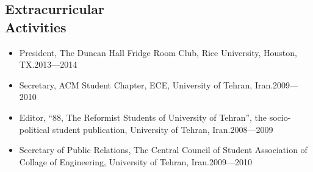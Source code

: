 \documentclass[overlapped]{res}
\begin{document}
\begin{resume}
\section{Extracurricular\\ Activities}
\begin{itemize}
\item President, The Duncan Hall Fridge Room Club, Rice University, Houston, TX.\hfill 2013---2014
\item Secretary, ACM Student Chapter, ECE, University of Tehran, Iran.\hfill 2009---2010
\item Editor, ``88, The Reformist Students of University of Tehran'', the socio-political student publication, University of Tehran, Iran.\hfill 2008---2009
\item Secretary of Public Relations, The Central Council of Student Association of Collage of Engineering, University of Tehran, Iran.\hfill 2009---2010
\end{itemize}

\end{resume}
\end{document}
